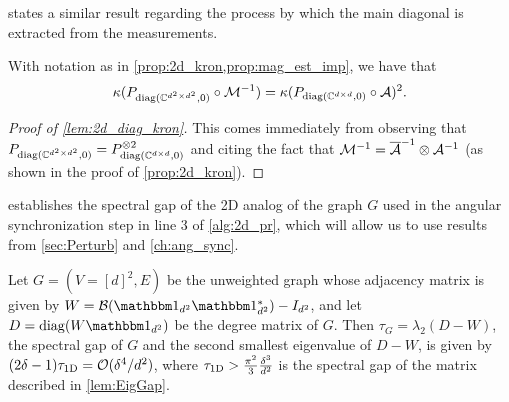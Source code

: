  states a similar result regarding the process by which the main diagonal is extracted from the measurements.
\begin{lemma}
  With notation as in \cref{prop:2d_kron,prop:mag_est_imp}, we have that \[\kappa(P_{\operatorname{diag}(\mathbb{C}^{d^2 \times d^2}, 0)} \circ \mathcal{M}^{-1}) = \kappa(P_{\operatorname{diag}(\mathbb{C}^{d \times d}, 0)} \circ \mathcal{A})^2.\]
  \label{lem:2d_diag_kron}
\end{lemma}
\begin{proof}[Proof of \cref{lem:2d_diag_kron}]
  This comes immediately from observing that $P_{\operatorname{diag}(\mathbb{C}^{d^2 \times d^2}, 0)} = P_{\operatorname{diag}(\mathbb{C}^{d \times d}, 0)}^{\otimes 2}$ and citing the fact that $\mathcal{M}^{-1} = \overline{\mathcal{A}}^{-1} \otimes \mathcal{A}^{-1}$ (as shown in the proof of \cref{prop:2d_kron}).
\end{proof}

 establishes the spectral gap of the 2D analog of the graph $G$ used in the angular synchronization step in line 3 of \cref{alg:2d_pr}, which will allow us to use results from \cref{sec:Perturb} and \cref{ch:ang_sync}.
\begin{proposition}
  Let $G = (V = [d]^2, E)$ be the unweighted graph whose adjacency matrix is given by $W = \B(\one_{d^2} \one_{d^2}^*) - I_{d^2}$, and let $D = \diag(W \one_{d^2})$ be the degree matrix of $G$.  Then $\tau_G = \lambda_2(D - W)$, the spectral gap of $G$ and the second smallest eigenvalue of $D - W$, is given by $(2 \delta - 1) \tau_{\rm 1D} = \mathcal{O}(\delta^4 / d^2)$, where $\tau_{\rm 1D} > \frac{\pi^2}{3}\frac{\delta^3}{d^2}$ is the spectral gap of the matrix described in \cref{lem:EigGap}.
  \label{prop:2d_specgap}
\end{proposition}

